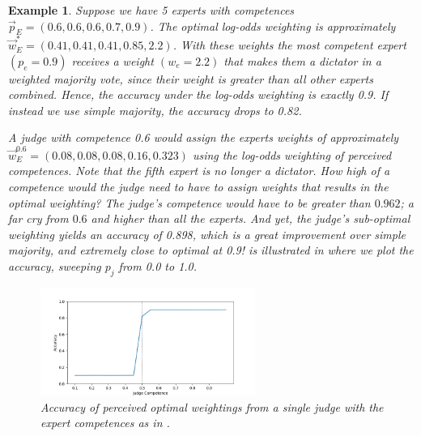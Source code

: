 \documentclass[letterpaper]{article} %
\newtheorem{example}{Example}
\newcommand{\experts}{\ensuremath{E} }
\newcommand{\expert}{\ensuremath{e} }
\begin{document}
\begin{example}\label{example:motivation}
Suppose we have 5 experts with competences $\vec{p}_\experts = (0.6, 0.6, 0.6, 0.7, 0.9)$. The optimal log-odds weighting is approximately $\vec{w}^*_\experts = (0.41, 0.41, 0.41, 0.85, 2.2)$. With these weights the most competent expert $(p_\expert = 0.9)$ receives a weight $(w_\expert = 2.2)$ that makes them a dictator in a weighted majority vote, since their weight is greater than all other experts combined. Hence, the accuracy under the log-odds weighting is exactly 0.9. If instead we use simple majority, the accuracy drops to 0.82.

A judge with competence 0.6 would assign the experts weights of approximately $\vec{w}^{0.6}_\experts = (0.08, 0.08, 0.08, 0.16, 0.323)$ using the log-odds weighting of perceived competences. Note that the fifth expert is no longer a dictator.
%
%
How high of a competence would the judge need to have to assign weights that results in the optimal weighting?
The judge's competence would have to be greater than $0.962$; a far cry from $0.6$ and higher than all the experts.
%
And yet, the judge's sub-optimal weighting yields an accuracy of 0.898, which is a great improvement over simple majority, and extremely close to optimal at 0.9!
%
 is illustrated in  where we plot the accuracy, sweeping $p_j$ from 0.0 to 1.0.

\begin{figure}[h]
 \centering
 \includegraphics[height=3.5cm]{./Figures/Example_Flat.png}
 \caption{Accuracy of perceived optimal weightings from a single judge with the expert competences as in .}
 \label{fig:example}
\end{figure}
\end{example}
\end{document}
